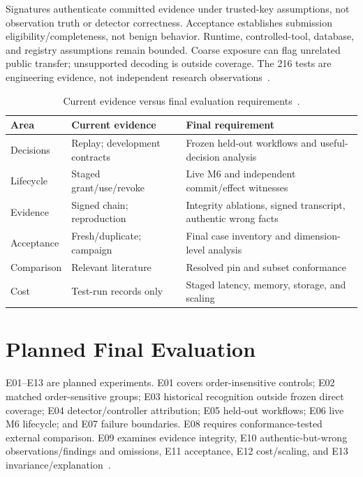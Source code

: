 \documentclass[conference]{IEEEtran}
\begin{document}
Signatures authenticate committed evidence under trusted-key assumptions, not observation truth or detector correctness. Acceptance establishes submission eligibility/completeness, not benign behavior. Runtime, controlled-tool, database, and registry assumptions remain bounded. Coarse exposure can flag unrelated public transfer; unsupported decoding is outside coverage. The 216 tests are engineering evidence, not independent research observations~\cite{cgthreat,cgresults}.

\begin{table}[t]
\centering
\caption{Current evidence versus final evaluation requirements~\cite{cgresults,cgprotocol}.}
\label{tab:remaining}
\small
\setlength{\tabcolsep}{3pt}
\renewcommand{\arraystretch}{1.15}
\begin{tabular}{@{}p{}p{}p{}@{}}
\toprule
Area & Current evidence & Final requirement \\
\midrule
Decisions & Replay; development contracts & Frozen held-out workflows and useful-decision analysis \\
Lifecycle & Staged grant/use/revoke & Live M6 and independent commit/effect witnesses \\
Evidence & Signed chain; reproduction & Integrity ablations, signed transcript, authentic wrong facts \\
Acceptance & Fresh/duplicate; campaign & Final case inventory and dimension-level analysis \\
Comparison & Relevant literature & Resolved pin and subset conformance \\
Cost & Test-run records only & Staged latency, memory, storage, and scaling \\
\bottomrule
\end{tabular}
\end{table}

\section{Planned Final Evaluation}
E01--E13 are planned experiments. E01 covers order-insensitive controls; E02 matched order-sensitive groups; E03 historical recognition outside frozen direct coverage; E04 detector/controller attribution; E05 held-out workflows; E06 live M6 lifecycle; and E07 failure boundaries. E08 requires conformance-tested external comparison. E09 examines evidence integrity, E10 authentic-but-wrong observations/findings and omissions, E11 acceptance, E12 cost/scaling, and E13 invariance/explanation~\cite{cgprotocol}.
\end{document}
